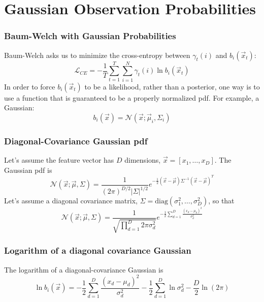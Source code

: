 \documentclass{beamer}
\begin{document}
\section[Gaussians]{Gaussian Observation Probabilities}
\setcounter{subsection}{1}

\begin{frame}
  \frametitle{Baum-Welch with Gaussian Probabilities}

  Baum-Welch asks us to minimize the cross-entropy between
  $\gamma_t(i)$ and $b_i(\vec{x}_t)$:
  \begin{displaymath}
    {\mathcal L}_{CE} = -\frac{1}{T}\sum_{t=1}^T\sum_{i=1}^N\gamma_t(i)\ln b_i(\vec{x}_t)
  \end{displaymath}
  In order to force $b_i(\vec{x}_t)$ to be a likelihood, rather than a
  posterior, one way is to use a function that is guaranteed to be a
  properly normalized pdf.  For example, a Gaussian:
  \begin{displaymath}
    b_i(\vec{x}) = {\mathcal N}\left(\vec{x};\vec\mu_i,\Sigma_i\right)
  \end{displaymath}
\end{frame}
  
\begin{frame}
  \frametitle{Diagonal-Covariance Gaussian pdf}

  Let's assume the feature vector has $D$ dimensions,
  $\vec{x}=[x_1,\ldots,x_D]$.  The Gaussian pdf is
  \begin{displaymath}
    {\mathcal N}\left(\vec{x};\vec\mu,\Sigma\right)=
    \frac{1}{(2\pi)^{D/2}|\Sigma|^{1/2}}e^{-\frac{1}{2}(\vec{x}-\vec\mu)\Sigma^{-1}(\vec{x}-\vec\mu)^T}
  \end{displaymath}
  Let's assume a diagonal covariance matrix,
  $\Sigma=\mbox{diag}(\sigma_1^2,\ldots,\sigma_D^2)$, so that
  \begin{displaymath}
    {\mathcal N}\left(\vec{x};\vec\mu,\Sigma\right)=
    \frac{1}{\sqrt{\prod_{d=1}^D2\pi\sigma_d^2}}e^{-\frac{1}{2}\sum_{d=1}^D\frac{(x_d-\mu_d)^2}{\sigma_d^2}}
  \end{displaymath}
\end{frame}
  
\begin{frame}
  \frametitle{Logarithm of a diagonal covariance Gaussian}

  The logarithm of a diagonal-covariance Gaussian is
  \begin{displaymath}
    \ln b_i(\vec{x})=
    -\frac{1}{2}\sum_{d=1}^D\frac{(x_d-\mu_d)^2}{\sigma_d^2}
    -\frac{1}{2}\sum_{d=1}^D\ln\sigma_d^2
    -\frac{D}{2}\ln(2\pi)
  \end{displaymath}
\end{frame}
\end{document}
